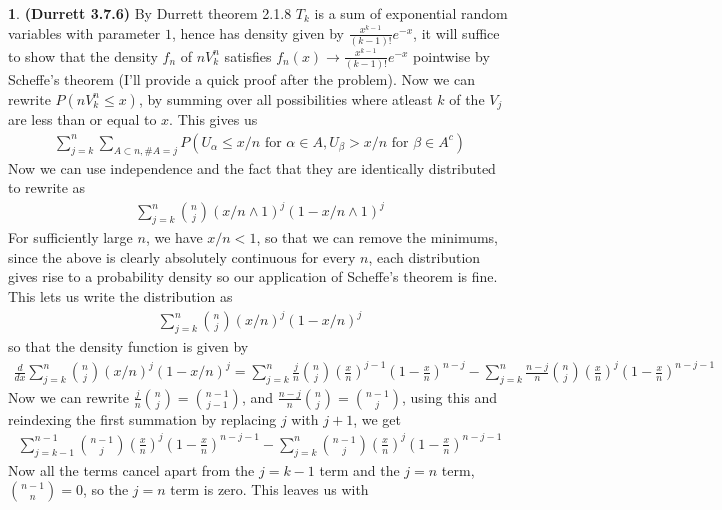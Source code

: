 \documentclass{article}
\theoremstyle{definition}
\newtheorem{pb}{}
\begin{document}
    \begin{pb}\textbf{(Durrett 3.7.6)}
        By Durrett theorem 2.1.8 \(T_k\) is a sum of exponential random variables with parameter \(1\), hence has density given by \(\frac{x^{k-1}}{(k-1)!}e^{-x}\), it will suffice to show that the density \(f_n\) of \(nV_k^n\) satisfies \(f_n(x) \to \frac{x^{k-1}}{(k-1)!}e^{-x}\) pointwise by Scheffe's theorem (I'll provide a quick proof after the problem). Now we can rewrite \(P(nV_k^n \leq x)\), by summing over all possibilities where atleast \(k\) of the \(V_j\) are less than or equal to \(x\). This gives us
        \begin{align*}
            \sum_{j=k}^n \sum_{A \subset n, \# A = j} P(U_\alpha \leq x/n \text{ for } \alpha \in A, U_{\beta} > x/n \text{ for } \beta \in A^c)
        \end{align*}
        Now we can use independence and the fact that they are identically distributed to rewrite as
        \begin{align*}
            \sum_{j=k}^n \binom{n}{j}(x/n\wedge 1)^j (1 - x/n\wedge 1)^j
        \end{align*}
        For sufficiently large \(n\), we have \(x/n < 1\), so that we can remove the minimums, since the above is clearly absolutely continuous for every \(n\), each distribution gives rise to a probability density so our application of Scheffe's theorem is fine. This lets us write the distribution as
        \begin{align*}
            \sum_{j=k}^n \binom{n}{j}(x/n)^j (1 - x/n)^j
        \end{align*}
        so that the density function is given by
        \begin{align*}
            \frac{d}{dx}\sum_{j=k}^n \binom{n}{j}(x/n)^j (1 - x/n)^j = \sum_{j=k}^n \frac{j}{n}\binom{n}{j}(\frac{x}{n})^{j-1}(1-\frac{x}{n})^{n-j} - \sum_{j=k}^n \frac{n-j}{n}\binom{n}{j}(\frac{x}{n})^{j}(1-\frac{x}{n})^{n-j-1}
        \end{align*}
        Now we can rewrite \(\frac{j}{n}\binom{n}{j} = \binom{n-1}{j-1}\), and \(\frac{n-j}{n}\binom{n}{j} = \binom{n-1}{j}\), using this and reindexing the first summation by replacing \(j\) with \(j+1\), we get
        \begin{align*}
            \sum_{j=k-1}^{n-1} \binom{n-1}{j}(\frac{x}{n})^j(1 - \frac{x}{n})^{n-j-1} - \sum_{j=k}^n \binom{n-1}{j}(\frac{x}{n})^j(1-\frac{x}{n})^{n-j-1}
        \end{align*}
        Now all the terms cancel apart from the \(j = k-1\) term and the \(j=n\) term, \(\binom{n-1}{n} = 0\), so the \(j=n\) term is zero. This leaves us with

\end{pb}
\end{document}
